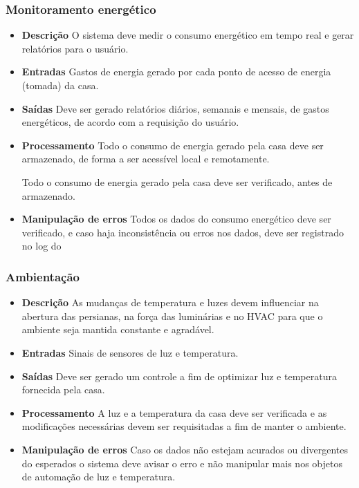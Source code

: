 \subsubsection{Monitoramento energético}
\begin{itemize}

	\item \textbf{Descrição}
	O sistema deve medir o consumo energético em tempo real e gerar relatórios para o usuário.

	\item \textbf{Entradas}
Gastos de energia gerado por cada ponto de acesso de energia (tomada) da casa.

	\item \textbf{Saídas}
	Deve ser gerado relatórios diários, semanais e mensais, de gastos energéticos, de acordo com a requisição do usuário.

	\item \textbf{Processamento}
	Todo o consumo de energia gerado pela casa deve ser armazenado, de forma a ser acessível local e remotamente.

	Todo o consumo de energia gerado pela casa deve ser verificado, antes de
armazenado.

	\item \textbf{Manipulação de erros}
	Todos os dados do consumo energético deve ser verificado, e caso haja inconsistência ou erros nos dados, deve ser
	registrado no log do

\end{itemize}

\subsubsection{Ambientação}
\begin{itemize}
	\item \textbf{Descrição}
	As mudanças de temperatura e luzes devem influenciar na abertura das persianas, na força das luminárias e no HVAC
	para que o ambiente seja mantida constante e agradável.

	\item \textbf{Entradas}
	Sinais de sensores de luz e temperatura.

	\item \textbf{Saídas}
	Deve ser gerado um controle a fim de optimizar luz e temperatura fornecida pela casa.

	\item \textbf{Processamento}
	A luz e a temperatura da casa deve ser verificada e as modificações necessárias devem ser requisitadas a fim de
	manter o ambiente.

	\item \textbf{Manipulação de erros}
	Caso os dados não estejam acurados ou divergentes do esperados o sistema deve avisar o erro e não manipular mais
	nos objetos de automação de luz e temperatura.

\end{itemize}

